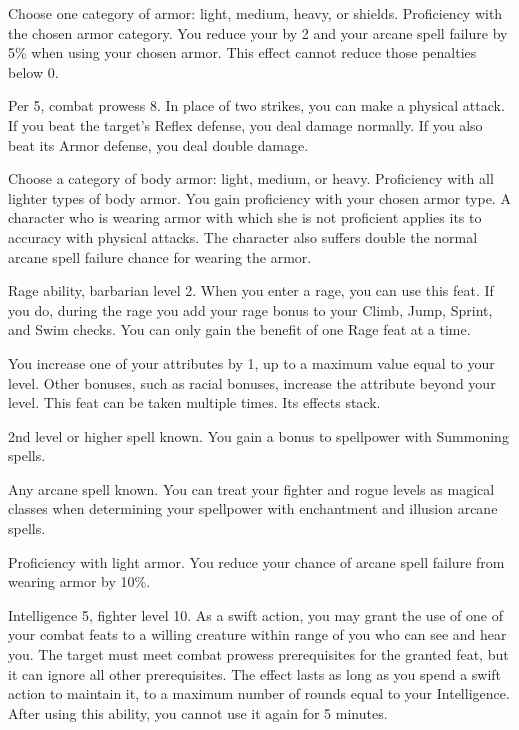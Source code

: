 Choose one category of armor: light, medium, heavy, or shields.
\featpre Proficiency with the chosen armor category.
\featben You reduce your  by 2 and your arcane spell failure by 5\% when using your chosen armor.
This effect cannot reduce those penalties below 0.

\featpre Per 5, combat prowess 8.
\featben In place of two strikes, you can make a physical attack.
If you beat the target's Reflex defense, you deal damage normally.
If you also beat its Armor defense, you deal double damage.

Choose a category of body armor: light, medium, or heavy.
\featpre Proficiency with all lighter types of body armor.
\featben You gain proficiency with your chosen armor type.
A character who is wearing armor with which she is not proficient applies its  to accuracy with physical attacks.
The character also suffers double the normal arcane spell failure chance for wearing the armor.

\featpre Rage ability, barbarian level 2.
\featben When you enter a rage, you can use this feat. If you do, during the rage you add your rage bonus to your Climb, Jump, Sprint, and Swim checks.
 You can only gain the benefit of one Rage feat at a time.

\featben You increase one of your attributes by 1, up to a maximum value equal to your level.
Other bonuses, such as racial bonuses, increase the attribute beyond your level.
 This feat can be taken multiple times. Its effects stack.

\featpre 2nd level or higher  spell known.
\featben You gain a  bonus to spellpower with Summoning spells.

\featpre Any arcane spell known.
\featben You can treat your fighter and rogue levels as magical classes when determining your spellpower with enchantment and illusion arcane spells.

\featpre Proficiency with light armor.
\featben You reduce your chance of arcane spell failure from wearing armor by 10\%.

\featpre Intelligence 5, fighter level 10.
\featben As a swift action, you may grant the use of one of your combat feats to a willing creature within \rngmed range of you who can see and hear you.
The target must meet combat prowess prerequisites for the granted feat, but it can ignore all other prerequisites.
The effect lasts as long as you spend a swift action to maintain it, to a maximum number of rounds equal to your Intelligence.
After using this ability, you cannot use it again for 5 minutes.


